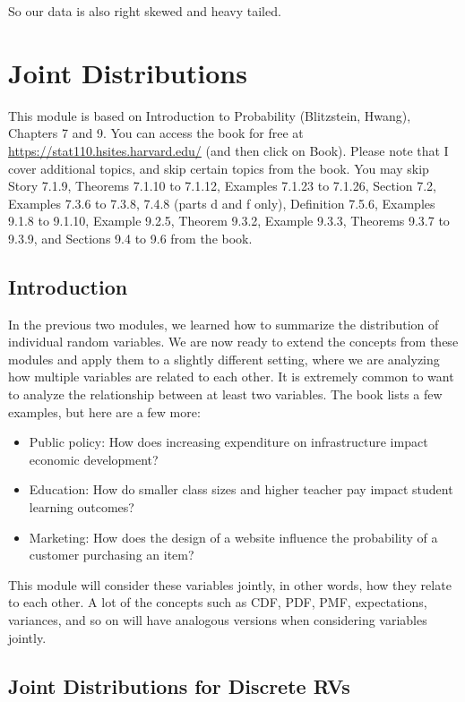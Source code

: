\documentclass[
]{book}
\providecommand{\tightlist}{%
  \setlength{\itemsep}{0pt}\setlength{\parskip}{0pt}}
\begin{document}
So our data is also right skewed and heavy tailed.

\chapter{Joint Distributions}\label{joint-distributions}

This module is based on Introduction to Probability (Blitzstein, Hwang), Chapters 7 and 9. You can access the book for free at \url{https://stat110.hsites.harvard.edu/} (and then click on Book). Please note that I cover additional topics, and skip certain topics from the book. You may skip Story 7.1.9, Theorems 7.1.10 to 7.1.12, Examples 7.1.23 to 7.1.26, Section 7.2, Examples 7.3.6 to 7.3.8, 7.4.8 (parts d and f only), Definition 7.5.6, Examples 9.1.8 to 9.1.10, Example 9.2.5, Theorem 9.3.2, Example 9.3.3, Theorems 9.3.7 to 9.3.9, and Sections 9.4 to 9.6 from the book.

\section{Introduction}\label{introduction-1}

In the previous two modules, we learned how to summarize the distribution of individual random variables. We are now ready to extend the concepts from these modules and apply them to a slightly different setting, where we are analyzing how multiple variables are related to each other. It is extremely common to want to analyze the relationship between at least two variables. The book lists a few examples, but here are a few more:

\begin{itemize}
\tightlist
\item
  Public policy: How does increasing expenditure on infrastructure impact economic development?
\item
  Education: How do smaller class sizes and higher teacher pay impact student learning outcomes?
\item
  Marketing: How does the design of a website influence the probability of a customer purchasing an item?
\end{itemize}

This module will consider these variables jointly, in other words, how they relate to each other. A lot of the concepts such as CDF, PDF, PMF, expectations, variances, and so on will have analogous versions when considering variables jointly.

\section{Joint Distributions for Discrete RVs}\label{joint-distributions-for-discrete-rvs}
\end{document}
